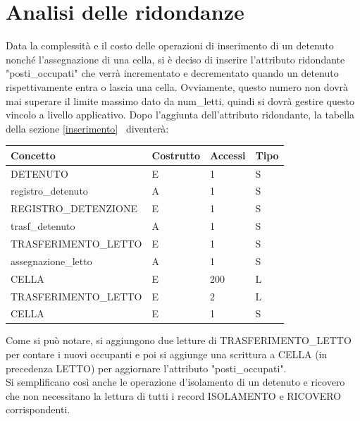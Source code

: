 \documentclass[a4paper,12pt]{report}
\begin{document}
\section{Analisi delle ridondanze}
Data la complessità e il costo delle operazioni di inserimento di un detenuto nonché l'assegnazione di una cella, si è deciso di inserire l'attributo ridondante "posti\_occupati" che verrà incrementato e decrementato quando un detenuto rispettivamente entra o lascia una cella.
%
Ovviamente, questo numero non dovrà mai superare il limite massimo dato da num\_letti, quindi si dovrà gestire questo vincolo a livello applicativo.
%
Dopo l'aggiunta dell'attributo ridondante, la tabella della sezione \ref{inserimento}~ diventerà: 
\begin{table}[H]
\begin{tabular}{p{6cm} p{2cm} p{1cm} p{1cm}}
\hline
Concetto & Costrutto & Accessi & Tipo \\ \hline
DETENUTO & E & 1 & S \\
registro\_detenuto & A & 1 & S \\
REGISTRO\_DETENZIONE & E & 1 & S \\
trasf\_detenuto & A & 1 & S \\
TRASFERIMENTO\_LETTO & E & 1 & S \\
assegnazione\_letto & A & 1 & S \\
CELLA & E & 200 & L \\
TRASFERIMENTO\_LETTO & E & 2 & L \\
CELLA & E & 1 & S
\end{tabular}
\end{table}
Come si può notare, si aggiungono due letture di TRASFERIMENTO\_LETTO per contare i nuovi occupanti e poi si aggiunge una scrittura a CELLA (in precedenza LETTO) per aggiornare l'attributo "posti\_occupati".
\\
Si semplificano così anche le operazione d'isolamento di un detenuto e ricovero che non necessitano la lettura di tutti i record ISOLAMENTO e RICOVERO corrispondenti.
\end{document}
